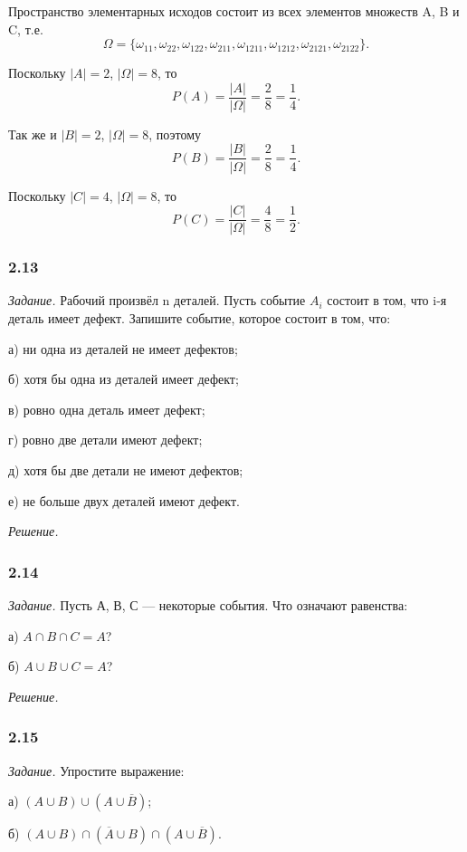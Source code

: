\documentclass{book}
\begin{document}
Пространство элементарных исходов состоит из всех элементов множеств A, B и C, т.е. $$\Omega=\{\omega_{11}, \omega_{22}, \omega_{122}, \omega_{211}, \omega_{1211}, \omega_{1212}, \omega_{2121}, \omega_{2122}\}.$$

Поскольку $|A|=2$, $|\Omega|=8$, то $$P(A)=\frac{|A|}{|\Omega|}=\frac{2}{8}=\frac{1}{4}.$$

Так же и $|B|=2$, $|\Omega|=8$, поэтому $$P(B)=\frac{|B|}{|\Omega|}=\frac{2}{8}=\frac{1}{4}.$$

Поскольку $|C|=4$, $|\Omega|=8$, то $$P(C)=\frac{|C|}{|\Omega|}=\frac{4}{8}=\frac{1}{2}.$$

\subsubsection*{2.13}

\textit{Задание.} Рабочий произвёл n деталей. Пусть событие $A_i$ состоит в том, что i-я деталь имеет дефект. Запишите событие, которое состоит в том, что:

а) ни одна из деталей не имеет дефектов;

б) хотя бы одна из деталей имеет дефект;

в) ровно одна деталь имеет дефект;

г) ровно две детали имеют дефект;

д) хотя бы две детали не имеют дефектов;

е) не больше двух деталей имеют дефект.

\textit{Решение.}

\subsubsection*{2.14}

\textit{Задание.} Пусть А, В, С --- некоторые события. Что означают равенства:

а) $A\cap B\cap C=A$?

б) $A\cup B\cup C=A$?

\textit{Решение.}

\subsubsection*{2.15}

\textit{Задание.} Упростите выражение:

а) $\left(A\cup B\right)\cup\left(A\cup\overline{B}\right)$;

б) $\left(A\cup B\right)\cap\left(\overline{A}\cup B\right)\cap\left(A\cup\overline{B}\right)$.
\end{document}
